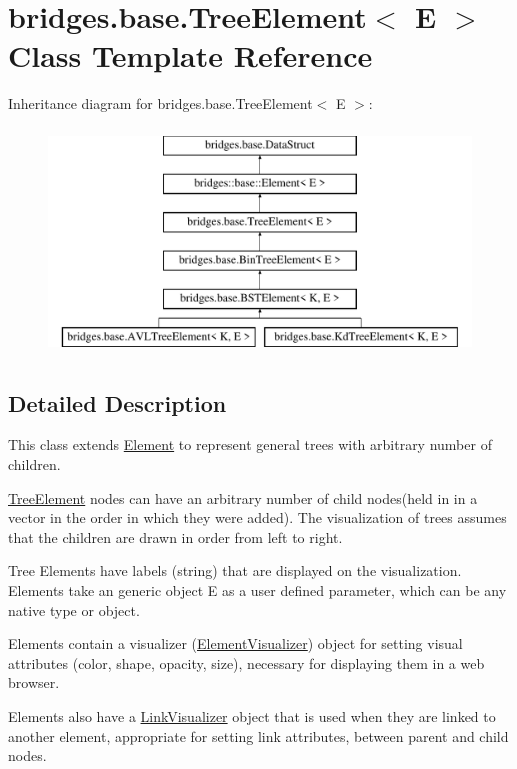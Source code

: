 \hypertarget{classbridges_1_1base_1_1_tree_element}{}\section{bridges.\+base.\+Tree\+Element$<$ E $>$ Class Template Reference}
\label{classbridges_1_1base_1_1_tree_element}
Inheritance diagram for bridges.\+base.\+Tree\+Element$<$ E $>$\+:\begin{figure}[H]
\begin{center}
\leavevmode
\includegraphics[height=6.000000cm]{classbridges_1_1base_1_1_tree_element}
\end{center}
\end{figure}


\subsection{Detailed Description}
This class extends \hyperlink{classbridges_1_1base_1_1_element}{Element} to represent general trees with arbitrary number of children. 

\hyperlink{classbridges_1_1base_1_1_tree_element}{Tree\+Element} nodes can have an arbitrary number of child nodes(held in in a vector in the order in which they were added). The visualization of trees assumes that the children are drawn in order from left to right.

Tree Elements have labels (string) that are displayed on the visualization. Elements take an generic object E as a user defined parameter, which can be any native type or object.

Elements contain a visualizer (\hyperlink{classbridges_1_1base_1_1_element_visualizer}{Element\+Visualizer}) object for setting visual attributes (color, shape, opacity, size), necessary for displaying them in a web browser.

Elements also have a \hyperlink{classbridges_1_1base_1_1_link_visualizer}{Link\+Visualizer} object that is used when they are linked to another element, appropriate for setting link attributes, between parent and child nodes.

